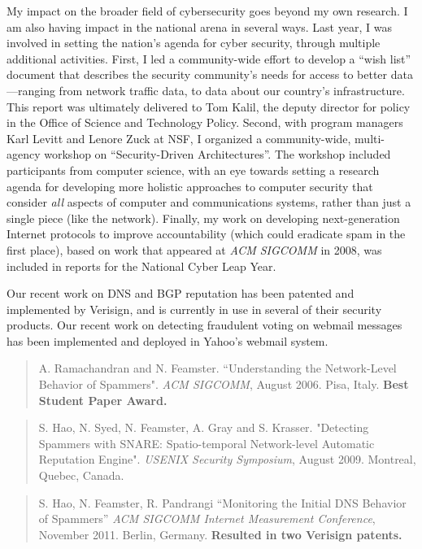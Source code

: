 My impact on the broader field of cybersecurity goes beyond my own
research.  I am also having impact in the national arena in several
ways.  Last year, I was involved in setting the nation's agenda for
cyber security, through multiple additional activities.  First, I led a
community-wide effort to develop a ``wish list'' document that describes
the security community's needs for access to better data---ranging from
network traffic data, to data about our country's infrastructure.  This
report was ultimately delivered to Tom Kalil, the deputy director for
policy in the Office of Science and Technology Policy.  Second, with
program managers Karl Levitt and Lenore Zuck at NSF, I organized a
community-wide, multi-agency workshop on ``Security-Driven
Architectures''.  The workshop included participants from computer
science, with an eye towards setting a research agenda for developing
more holistic approaches to computer security that consider {\em all}
aspects of computer and communications systems, rather than just a
single piece (like the network).  Finally, my work on developing
next-generation Internet protocols to improve accountability (which
could eradicate spam in the first place), based on work that appeared at
{\em ACM SIGCOMM} in 2008, was included in reports for the
National Cyber Leap Year.

Our recent work on DNS and BGP reputation has been patented and
implemented by Verisign, and is currently in use in several of their
security products.  Our recent work on detecting fraudulent voting on
webmail messages has been implemented and deployed in Yahoo's webmail system.

\begin{quote}
A. Ramachandran and N. Feamster. ``Understanding the Network-Level
Behavior of Spammers". {\em ACM SIGCOMM}, August 2006. Pisa, Italy. {\bf
Best Student Paper Award.}
\end{quote}


\begin{quote}
S. Hao, N. Syed, N. Feamster, A. Gray and S. Krasser. "Detecting
Spammers with SNARE: Spatio-temporal Network-level Automatic Reputation
Engine". {\em USENIX Security Symposium}, August 2009. Montreal, Quebec,
Canada. 
\end{quote}

\begin{quote}
S. Hao, N. Feamster, R. Pandrangi
``Monitoring the Initial DNS Behavior of Spammers''
{\em ACM SIGCOMM Internet Measurement Conference},
November 2011. Berlin, Germany. {\bf Resulted in two Verisign patents.}
\end{quote}







